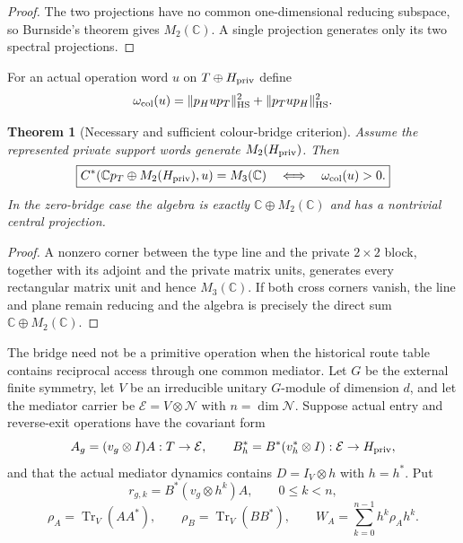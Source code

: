 \documentclass[11pt]{article}
\newtheorem{theorem}{Theorem}[section]
\theoremstyle{definition}
\theoremstyle{remark}
\newcommand{\C}{\mathbb C}
\newcommand{\Tr}{\operatorname{Tr}}
\newcommand{\HS}{\mathrm{HS}}
\newcommand{\norm}[1]{\lVert#1\rVert}
\begin{document}
\begin{proof}
The two projections have no common one-dimensional reducing subspace, so
Burnside's theorem gives $M_2(\C)$.  A single projection generates only its
two spectral projections.
\end{proof}

For an actual operation word $u$ on $T\oplus H_{\rm priv}$ define
\begin{equation}
\omega_{\rm col}(u)
=
\norm{p_Hup_T}_{\HS}^2+\norm{p_Tup_H}_{\HS}^2.
\label{eq:colour-bridge}
\end{equation}

\begin{theorem}[Necessary and sufficient colour-bridge criterion]
\label{thm:colour-bridge}
Assume the represented private support words generate $M_2(H_{\rm priv})$.
Then
\begin{equation}
\boxed{
C^*(\C p_T\oplus M_2(H_{\rm priv}),u)
=
M_3(\C)
\quad\Longleftrightarrow\quad
\omega_{\rm col}(u)>0.}
\label{eq:colour-M3}
\end{equation}
In the zero-bridge case the algebra is exactly
$\C\oplus M_2(\C)$ and has a nontrivial central projection.
\end{theorem}

\begin{proof}
A nonzero corner between the type line and the private $2\times2$ block,
together with its adjoint and the private matrix units, generates every
rectangular matrix unit and hence $M_3(\C)$.  If both cross corners vanish,
the line and plane remain reducing and the algebra is precisely the direct
sum $\C\oplus M_2(\C)$.
\end{proof}

The bridge need not be a primitive operation when the historical route table
contains reciprocal access through one common mediator.  Let $G$ be the
external finite symmetry, let $V$ be an irreducible unitary $G$-module of
dimension $d$, and let the mediator carrier be
$\mathcal E=V\otimes\mathcal N$ with $n=\dim\mathcal N$.  Suppose actual entry
and reverse-exit operations have the covariant form
\[
 A_g=(v_g\otimes I)A:T\to\mathcal E,
 \qquad
 B_h^*=B^*(v_h^*\otimes I):\mathcal E\to H_{\rm priv},
\]
and that the actual mediator dynamics contains
$D=I_V\otimes h$ with $h=h^*$.  Put
\[
 r_{g,k}=B^*(v_g\otimes h^k)A,
 \qquad 0\le k<n,
\]
\[
 \rho_A=\Tr_V(AA^*),\qquad
 \rho_B=\Tr_V(BB^*),\qquad
 W_A=\sum_{k=0}^{n-1}h^k\rho_Ah^k.
\]
\end{document}
